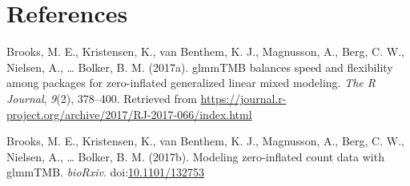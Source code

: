 \documentclass[floatsintext,man]{apa6}
\theoremstyle{definition}
\theoremstyle{definition}
\theoremstyle{definition}
\theoremstyle{remark}
\begin{document}
\FloatBarrier

\section{References}\label{refs}

\begingroup
\setlength{\parindent}{-0.5in} \setlength{\leftskip}{0.5in}

\hypertarget{refs}{}
\hypertarget{ref-R-glmmTMB}{}
Brooks, M. E., Kristensen, K., van Benthem, K. J., Magnusson, A., Berg,
C. W., Nielsen, A., \ldots{} Bolker, B. M. (2017a). glmmTMB balances
speed and flexibility among packages for zero-inflated generalized
linear mixed modeling. \emph{The R Journal}, \emph{9}(2), 378--400.
Retrieved from
\url{https://journal.r-project.org/archive/2017/RJ-2017-066/index.html}

\hypertarget{ref-brooks2017modeling}{}
Brooks, M. E., Kristensen, K., van Benthem, K. J., Magnusson, A., Berg,
C. W., Nielsen, A., \ldots{} Bolker, B. M. (2017b). Modeling
zero-inflated count data with glmmTMB. \emph{bioRxiv}.
doi:\href{https://doi.org/10.1101/132753}{10.1101/132753}

\endgroup
\end{document}
